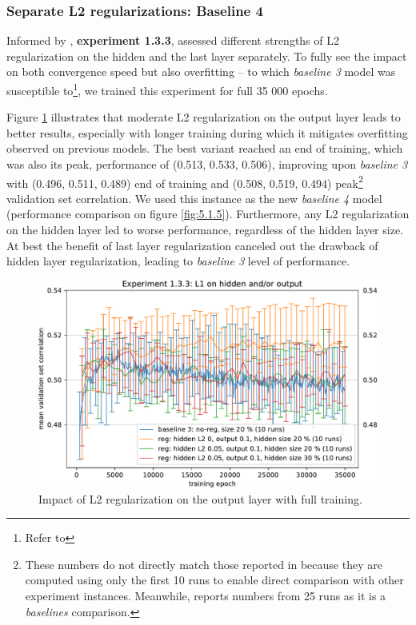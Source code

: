 \subsubsection{Separate L2 regularizations: Baseline 4}\label{ex:1.3.3}

Informed by , \textbf{experiment 1.3.3}, assessed different strengths of L2 regularization on the hidden and the last layer separately. To fully see the impact on both convergence speed but also overfitting -- to which \textit{baseline 3} model was susceptible to\footnote{Refer to }, we trained this experiment for full 35 000 epochs.

Figure \ref{fig:5.1.3.3} illustrates that moderate L2 regularization on the output layer leads to better results, especially with longer training during which it mitigates overfitting observed on previous models. The best variant reached an end of training, which was also its peak, performance of (0.513, 0.533, 0.506), improving upon \textit{baseline 3} with (0.496, 0.511, 0.489) end of training and (0.508, 0.519, 0.494) peak\footnote{These numbers do not directly match those reported in  because they are computed using only the first 10 runs to enable direct comparison with other experiment instances. Meanwhile,  reports numbers from 25 runs as it is a \textit{baselines} comparison.} validation set correlation. We used this instance as the new \textit{baseline 4} model (performance comparison on figure \ref{fig:5.1.5}). Furthermore, any L2 regularization on the hidden layer led to worse performance, regardless of the hidden layer size. At best the benefit of last layer regularization canceled out the drawback of hidden layer regularization, leading to \textit{baseline 3} level of performance.

\begin{figure}[H]
    \centering
    \includegraphics[width=1\textwidth]{../figures/05_1_3_3}
    \caption[Experiment 1.3.3]{Impact of L2 regularization on the output layer with full training.}
    \label{fig:5.1.3.3}
\end{figure}

